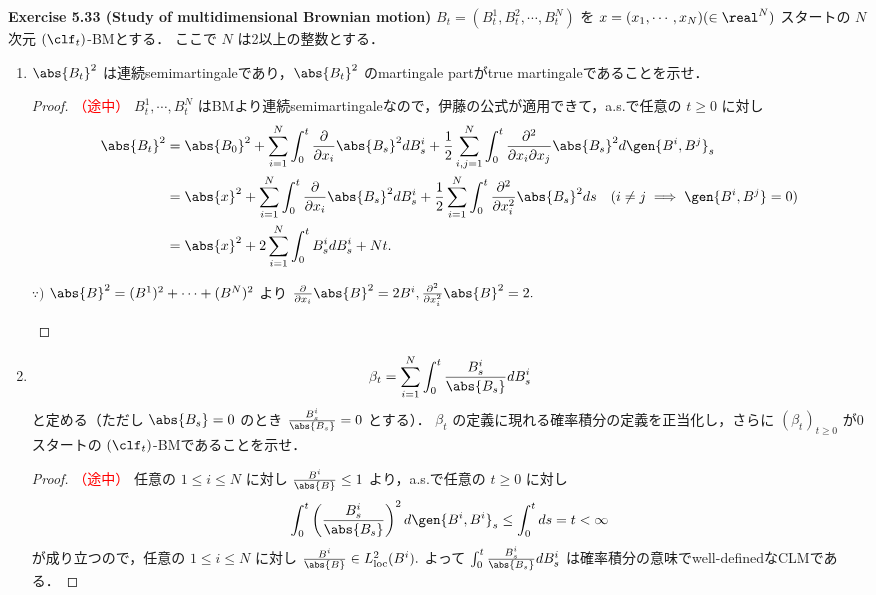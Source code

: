 \documentclass{jsarticle}
\begin{document}
\textbf{Exercise 5.33 (Study of multidimensional Brownian motion)}
$B_t=(B_t^{1},B_t^{2},\dotsb,B_t^{N})$ を $x=(x_1,\dotsb,x_N)(\in\real^N)$ スタートの $N$ 次元 $(\clf_t)$-BMとする．
ここで $N$ は2以上の整数とする．
\begin{enumerate}
    \item
    $\abs{B_t}^2$ は連続semimartingaleであり，$\abs{B_t}^2$ のmartingale partがtrue martingaleであることを示せ．
    \begin{proof}\textcolor{red}{（途中）}
        $B_t^{1},\dotsb,B_t^{N}$ はBMより連続semimartingaleなので，伊藤の公式が適用できて，a.s.で任意の $t\ge0$ に対し
        \begin{align}
            \abs{B_t}^2
            &= \abs{B_0}^2
            + \sum_{i=1}^{N}\int_{0}^{t}\frac{\partial}{\partial x_i}\abs{B_s}^2 dB_s^i
            + \frac{1}{2}\sum_{i,j=1}^{N}\int_{0}^{t}\frac{\partial^2}{\partial x_i\partial x_j}\abs{B_s}^2 d\gen{B^i,B^j}_s \\
            &= \abs{x}^2
            + \sum_{i=1}^{N}\int_{0}^{t}\frac{\partial}{\partial x_i}\abs{B_s}^2 dB_s^i
            + \frac{1}{2}\sum_{i=1}^{N}\int_{0}^{t}\frac{\partial^2}{\partial x_i^2}\abs{B_s}^2 ds
            \quad(i\neq j\implies\gen{B^i,B^j}=0)\\
            &= \abs{x}^2
            + 2\sum_{i=1}^{N}\int_{0}^{t}B_s^i dB_s^i
            + Nt.
        \end{align}
        \begin{screen}
            $\because)$ $\abs{B}^2=(B^1)^2+\dotsb+(B^N)^2$ より $\frac{\partial}{\partial x_i}\abs{B}^2=2B^i, \frac{\partial^2}{\partial x_i^2}\abs{B}^2=2.$
        \end{screen}
    \end{proof}
    
    \item
    \begin{align}
        \beta_t
        = \sum_{i=1}^{N}\int_{0}^{t}\frac{B_{s}^{i}}{\abs{B_s}}dB_s^i
    \end{align}
    と定める（ただし $\abs{B_s}=0$ のとき $\frac{B_{s}^{i}}{\abs{B_s}}=0$ とする）．
    $\beta_t$ の定義に現れる確率積分の定義を正当化し，さらに $(\beta_t)_{t\ge0}$ が0スタートの $(\clf_t)$-BMであることを示せ．
    \begin{proof}\textcolor{red}{（途中）}
        任意の $1\le i\le N$ に対し $\frac{B^i}{\abs{B}}\le1$ より，a.s.で任意の $t\ge0$ に対し
        \begin{align}
            \int_0^t \left(\frac{B_s^i}{\abs{B_s}}\right)^2 d\gen{B^i, B^i}_s
            \le \int_0^t ds = t < \infty
        \end{align}
        が成り立つので，任意の $1\le i\le N$ に対し $\frac{B^i}{\abs{B}}\in L_{\mathrm{loc}}^2(B^i).$
        よって $\int_{0}^{t}\frac{B_{s}^{i}}{\abs{B_s}}dB_s^i$ は確率積分の意味でwell-definedなCLMである．


\end{proof}
\end{enumerate}
\end{document}
